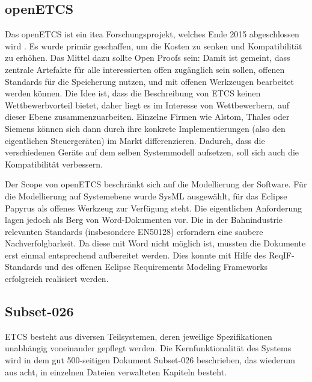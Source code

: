 \documentclass[twoside]{article}
\begin{document}
\begin{multicols}{2}
\subsection{openETCS}
\label{sec:openetcs}

Das openETCS ist ein itea Forschungsprojekt, welches Ende 2015 abgeschlossen wird \cite{itea-openetcs}. Es wurde primär geschaffen, um die Kosten zu senken und Kompatibilität zu erhöhen.  Das Mittel dazu sollte \glqq{}Open Proofs\grqq{} sein:  Damit ist gemeint, dass zentrale Artefakte für alle interessierten offen zugänglich sein sollen, offenen Standards für die Speicherung nutzen, und mit offenen Werkzeugen bearbeitet werden können.  Die Idee ist, dass die Beschreibung von ETCS keinen Wettbewerbvorteil bietet, daher liegt es im Interesse von Wettbewerbern, auf dieser Ebene zusammenzuarbeiten.  Einzelne Firmen wie Alstom, Thales oder Siemens können sich dann durch ihre konkrete Implementierungen (also den eigentlichen Steuergeräten) im Markt differenzieren.  Dadurch, dass die verschiedenen Geräte auf dem selben Systemmodell aufsetzen, soll sich auch die Kompatibilität verbessern.

Der Scope von openETCS beschränkt sich auf die Modellierung der Software.  Für die Modellierung auf Systemebene wurde SysML ausgewählt, für das Eclipse Papyrus als offenes Werkzeug zur Verfügung steht.  Die eigentlichen Anforderung lagen jedoch als Berg von Word-Dokumenten vor.  Die in der Bahnindustrie relevanten Standards (insbesondere EN50128) erforndern eine saubere Nachverfolgbarkeit.  Da diese mit Word nicht möglich ist, mussten die Dokumente erst einmal entsprechend aufbereitet werden. Dies konnte mit Hilfe des ReqIF-Standards und des offenen Eclipse Requirements Modeling Frameworks erfolgreich realisiert werden.

\subsection{Subset-026}
\label{sec:subset-26}

ETCS besteht aus diversen Teilsystemen, deren jeweilige Spezifikationen unabhängig voneinander gepflegt werden. Die Kernfunktionalität des Systems wird in dem gut 500-seitigen Dokument \glqq{}Subset-026\grqq{} beschrieben, das wiederum aus acht, in einzelnen Dateien verwalteten Kapiteln besteht.


\end{multicols}
\end{document}
